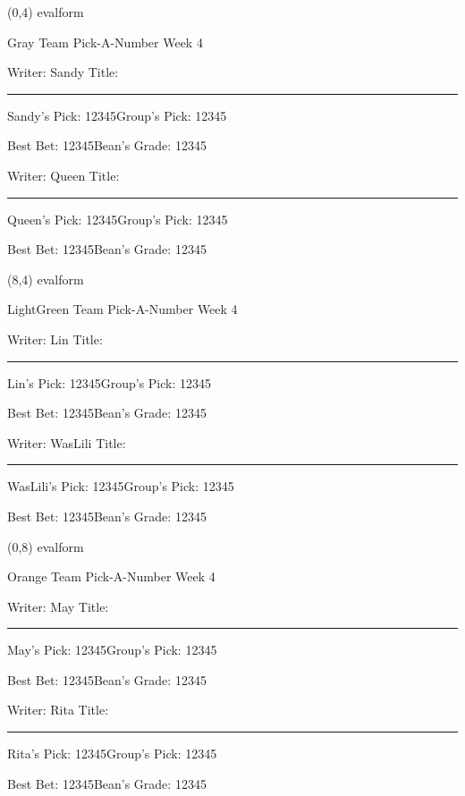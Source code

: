\documentclass[a4paper]{article}
\newcommand{\myeval}[1]{%
	\begin{description}
		\item Writer: #1 \hfill Title: \rule{4.5cm}{0.3pt} 
		\item #1's Pick: \hspace{0.25cm}1\hspace{0.25cm}2\hspace{0.25cm}3\hspace{0.25cm}4\hspace{0.25cm}5\hfill Group's Pick: \hspace{0.25cm}1\hspace{0.25cm}2\hspace{0.25cm}3\hspace{0.25cm}4\hspace{0.25cm}5\hspace{0.25cm}
		\item Best Bet: \hspace{0.25cm}1\hspace{0.25cm}2\hspace{0.25cm}3\hspace{0.25cm}4\hspace{0.25cm}5\hfill Bean's Grade: \hspace{0.25cm}1\hspace{0.25cm}2\hspace{0.25cm}3\hspace{0.25cm}4\hspace{0.25cm}5\hspace{0.25cm}
	\end{description}
}
\newcommand{\mycard}[6]{%
	\small #1
	\vspace{-0.5cm}
	\normalsize \begin{center} #2 Team Pick-A-Number Week #3\end{center}
	\vspace{-1.75cm}
	\parbox[t][8.05cm][c]{9.6cm}{%
	\normalsize
	#4
	#5
	#6
	}
}
\begin{document}
\begin{textblock}{8}(0,4)
\mycard{evalform}{Gray}{4}
{\myeval{Sandy}}{\myeval{Queen}}{}
\end{textblock}

\begin{textblock}{8}(8,4)
\mycard{evalform}{LightGreen}{4}
{\myeval{Lin}}{\myeval{WasLili}}{}
\end{textblock}

\begin{textblock}{8}(0,8)
\mycard{evalform}{Orange}{4}
{\myeval{May}}{\myeval{Rita}}{}
\end{textblock}
\end{document}
